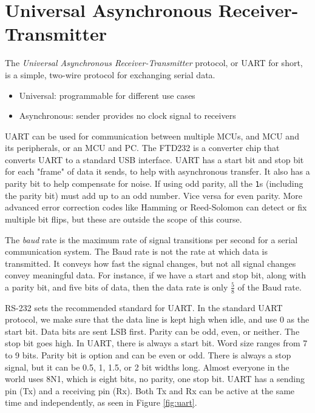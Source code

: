 \section{Universal Asynchronous Receiver-Transmitter}

The \emph{Universal Asynchronous Receiver-Transmitter}
protocol, or UART for short, is a
simple, two-wire protocol for
exchanging serial data.

\begin{itemize}
    \item Universal: programmable for different use cases
    \item Asynchronous: sender provides
          no clock signal to receivers
\end{itemize}

UART can be used for communication
between multiple MCUs, and MCU and
its peripherals, or an MCU and PC.
The FTD232 is a converter chip that
converts UART to a standard USB
interface. UART has a start bit and
stop bit for each "frame" of data it
sends, to help with asynchronous
transfer. It also has a parity bit
to help compensate for noise. If using
odd parity, all the \texttt{1}s
(including the parity bit)
must add up to an odd number. Vice
versa for even parity. More advanced
error correction codes like Hamming
or Reed-Solomon can detect or fix
multiple bit flips, but these are
outside the scope of this course.

The \emph{baud} rate is the maximum
rate of signal transitions per second
for a serial communication system.
The Baud rate is not the rate at which
data is transmitted. It conveys how
fast the signal changes, but not all
signal changes convey meaningful data.
For instance, if we have a start
and stop bit, along with a parity bit,
and five bits of data, then the data
rate is only $\frac{5}{8}$ of the Baud
rate.

RS-232 sets the recommended
standard for UART.
In the standard UART protocol,
we make sure that the data line is
kept high when idle, and use 0 as
the start bit. Data bits are sent
LSB first. Parity can be odd, even,
or neither. The stop bit goes high.
In UART, there is always a start
bit. Word size ranges from 7 to 9
bits. Parity bit is option and can
be even or odd. There is always a
stop signal, but it can be 0.5, 1,
1.5, or 2 bit widths long. Almost
everyone in the world uses 8N1, which
is eight bits, no parity, one stop
bit. UART has a sending pin (Tx) and a
receiving pin (Rx). Both Tx and Rx can be
active at the same time and independently,
as seen in Figure \ref{fig:uart}.


